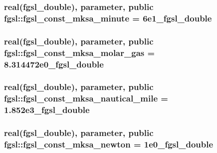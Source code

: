 \subsubsection[{fgsl\+\_\+const\+\_\+mksa\+\_\+minute}]{\setlength{\rightskip}{0pt plus 5cm}real({\bf fgsl\+\_\+double}), parameter, public fgsl\+::fgsl\+\_\+const\+\_\+mksa\+\_\+minute = 6e1\+\_\+fgsl\+\_\+double}\label{namespacefgsl_a5c0cc4ab0dc2be570d83ef0f9d2f4ba6}
\hypertarget{namespacefgsl_aba418557adafd1575eab5108ba172cf7}{}
\subsubsection[{fgsl\+\_\+const\+\_\+mksa\+\_\+molar\+\_\+gas}]{\setlength{\rightskip}{0pt plus 5cm}real({\bf fgsl\+\_\+double}), parameter, public fgsl\+::fgsl\+\_\+const\+\_\+mksa\+\_\+molar\+\_\+gas = 8.\+314472e0\+\_\+fgsl\+\_\+double}\label{namespacefgsl_aba418557adafd1575eab5108ba172cf7}
\hypertarget{namespacefgsl_a035a322332ff494af9c3ecfb5dca6125}{}
\subsubsection[{fgsl\+\_\+const\+\_\+mksa\+\_\+nautical\+\_\+mile}]{\setlength{\rightskip}{0pt plus 5cm}real({\bf fgsl\+\_\+double}), parameter, public fgsl\+::fgsl\+\_\+const\+\_\+mksa\+\_\+nautical\+\_\+mile = 1.\+852e3\+\_\+fgsl\+\_\+double}\label{namespacefgsl_a035a322332ff494af9c3ecfb5dca6125}
\hypertarget{namespacefgsl_a502e10d884393483a5f705039802ef9f}{}
\subsubsection[{fgsl\+\_\+const\+\_\+mksa\+\_\+newton}]{\setlength{\rightskip}{0pt plus 5cm}real({\bf fgsl\+\_\+double}), parameter, public fgsl\+::fgsl\+\_\+const\+\_\+mksa\+\_\+newton = 1e0\+\_\+fgsl\+\_\+double}\label{namespacefgsl_a502e10d884393483a5f705039802ef9f}
\hypertarget{namespacefgsl_a01a0e11a78d0097f8c8a170dbea03e3f}{}
